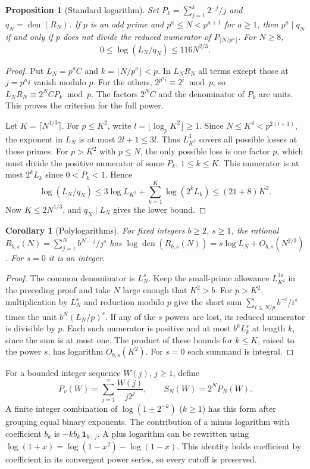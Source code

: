 \documentclass[11pt]{article}
\newtheorem{proposition}[theorem]{Proposition}
\newtheorem{corollary}[theorem]{Corollary}
\DeclareMathOperator{\den}{den}
\newcommand{\ind}{\mathbf 1}
\begin{document}
\begin{proposition}[Standard logarithm]\label{prop:standard}
Set $P_k=\sum_{j=1}^k2^{-j}/j$ and $q_N=\den(R_N)$. If $p$ is an odd prime and
$p^a\le N<p^{a+1}$ for $a\ge1$, then $p^a\mid q_N$ if and only if
$p$ does not divide the reduced numerator of $P_{\lfloor N/p^a\rfloor}$.
For $N\ge8$,
\[
 0\le\log(L_N/q_N)\le116 N^{2/3}.
\]
\end{proposition}
\begin{proof}
Put $L_N=p^a C$ and $k=\lfloor N/p^a\rfloor<p$. In $L_N R_N$ all terms
except those at $j=p^a i$ vanish modulo $p$. For the others,
$2^{p^a i}\equiv2^i\bmod p$, so $L_NR_N\equiv 2^NC P_k\bmod p$.
The factors $2^NC$ and the denominator of $P_k$ are units. This proves the
criterion for the full power.

Let $K=\lceil N^{1/3}\rceil$. For $p\le K^2$, write
$l=\lfloor\log_p K^2\rfloor\ge1$. Since $N\le K^4<p^{2(l+1)}$, the exponent
in $L_N$ is at most $2l+1\le3l$. Thus $L_{K^2}^3$ covers all possible losses
at these primes. For $p>K^2$ with $p\le N$, the only possible loss is one
factor $p$, which must divide the positive numerator of some $P_k$, $1\le k\le K$.
This numerator is at most $2^kL_k$ since $0<P_k<1$. Hence
\[
 \log(L_N/q_N)\le 3\log L_{K^2}+
   \sum_{k=1}^{K} \log(2^kL_k)\le(21+8)K^2 .
\]
Now $K\le2N^{1/3}$, and $q_N\mid L_N$ gives the lower bound.
\end{proof}

\begin{corollary}[Polylogarithms]\label{cor:poly}
For fixed integers $b\ge2$, $s\ge1$, the rational
$R_{b,s}(N)=\sum_{j=1}^N b^{N-j}/j^s$ has
$\log\den(R_{b,s}(N))=s\log L_N+O_{b,s}(N^{2/3})$. For $s=0$
it is an integer.
\end{corollary}
\begin{proof}
The common denominator is $L_N^s$. Keep the small-prime allowance
$L_{K^2}^{3s}$ in the preceding proof and take $N$ large enough that $K^2>b$.
For $p>K^2$, multiplication by $L_N^s$ and reduction modulo $p$ give the
short sum $\sum_{i\le N/p}b^{-i}/i^s$ times the unit $b^N(L_N/p)^s$.
If any of the $s$ powers are lost, its reduced numerator is divisible by $p$.
Each such numerator is positive and at most $b^kL_k^s$ at length $k$, since
the sum is at most one. The product of these bounds for $k\le K$, raised to
the power $s$, has logarithm $O_{b,s}(K^2)$. For $s=0$ each summand is integral.
\end{proof}

For a bounded integer sequence $W(j)$, $j\ge1$, define
\[
 P_v(W)=\sum_{j=1}^v\frac{W(j)}{j2^j},\qquad S_N(W)=2^NP_N(W).
\]
A finite integer combination of $\log(1\pm2^{-k})$ ($k\ge1$) has this
form after grouping equal binary exponents. The contribution of a minus
logarithm with coefficient $b_k$ is $-k b_k\,\ind_{k\mid j}$.
A plus logarithm can be rewritten using
$\log(1+x)=\log(1-x^2)-\log(1-x)$. This identity holds coefficient by
coefficient in its convergent power series, so every cutoff is preserved.
\end{document}
